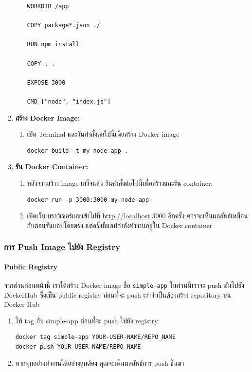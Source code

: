 \begin{enumerate}
\begin{enumerate}
\begin{verbatim}
WORKDIR /app

COPY package*.json ./

RUN npm install

COPY . .

EXPOSE 3000

CMD ["node", "index.js"]
        \end{verbatim}
          \end{enumerate}

    \item \textbf{สร้าง Docker Image:}
          \begin{enumerate}
              \item เปิด Terminal และรันคำสั่งต่อไปนี้เพื่อสร้าง Docker image
                    \begin{verbatim}
docker build -t my-node-app .
        \end{verbatim}
          \end{enumerate}

    \item \textbf{รัน Docker Container:}
          \begin{enumerate}
              \item หลังจากสร้าง image เสร็จแล้ว รันคำสั่งต่อไปนี้เพื่อสร้างและรัน container:
                    \begin{verbatim}
docker run -p 3000:3000 my-node-app
        \end{verbatim}
              \item เปิดเว็บเบราว์เซอร์และเข้าไปที่ \url{http://localhost:3000} อีกครั้ง ควรจะเห็นผลลัพธ์เหมือนกับตอนรันแอปโดยตรง แต่ครั้งนี้แอปกำลังทำงานอยู่ใน Docker container
          \end{enumerate}
\end{enumerate}

\subsubsection{การ Push Image ไปยัง Registry}

\paragraph{Public Registry}
จากส่วนก่อนหน้านี้ เราได้สร้าง Docker image ชื่อ \texttt{simple-app} ในส่วนนี้เราจะ push มันไปยัง DockerHub ซึ่งเป็น public registry
ก่อนที่จะ push เราจำเป็นต้องสร้าง repository บน Docker Hub

\begin{enumerate}
    \item ให้ tag กับ simple-app ก่อนที่จะ push ไปยัง registry:
          \begin{verbatim}
docker tag simple-app YOUR-USER-NAME/REPO_NAME
docker push YOUR-USER-NAME/REPO_NAME
    \end{verbatim}
    \item หากทุกอย่างทำงานได้อย่างถูกต้อง คุณจะเห็นผลลัพธ์การ push ขึ้นมา
\end{enumerate}

